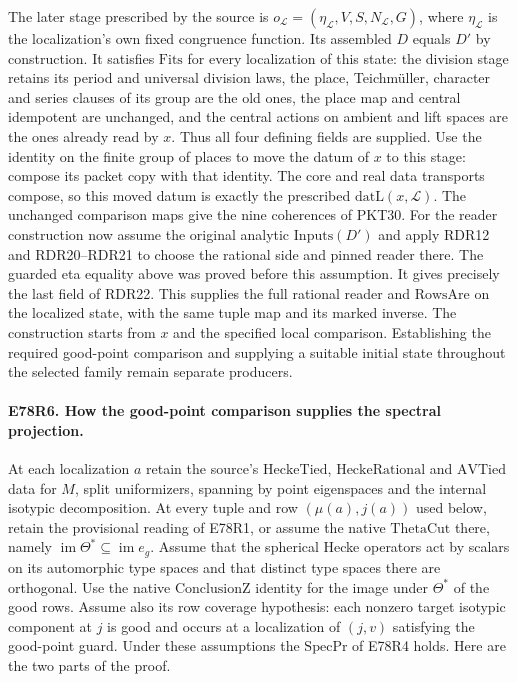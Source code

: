 The later stage prescribed by the source is
$o_{\mathcal L}=(\eta_{\mathcal L},V,S,N_{\mathcal L},G)$, where
$\eta_{\mathcal L}$ is the localization's own fixed congruence function.
Its assembled $D$ equals $D'$ by construction. It satisfies
$\mathrm{Fits}$ for every localization of this state: the division
stage retains its period and universal division laws, the place,
Teichm\"uller, character and series clauses of its group are the old
ones, the place map and central idempotent are unchanged, and the
central actions on ambient and lift spaces are the ones already
read by $x$. Thus all four defining fields are supplied. Use the identity on the finite group of places to move the datum
of $x$ to this stage: compose its packet copy with that identity.
The core and real data transports compose, so this moved datum is
exactly the prescribed $\mathrm{datL}(x,\mathcal L)$. The unchanged
comparison maps give the nine coherences of PKT30. For the reader
construction now assume the original analytic $\mathrm{Inputs}(D')$
and apply RDR12 and RDR20--RDR21 to choose the rational side and
pinned reader there. The guarded eta equality above was proved
before this assumption. It
gives precisely the last field of RDR22. This supplies the full
rational reader and $\mathrm{RowsAre}$ on the localized state, with
the same tuple map and its marked inverse. The construction starts
from $x$ and the specified local comparison. Establishing the
required good-point comparison and supplying a suitable initial state
throughout the selected family remain separate producers.

\paragraph{E78R6. How the good-point comparison supplies the spectral projection.}
At each localization $a$ retain the source's $\mathrm{HeckeTied}$,
$\mathrm{HeckeRational}$ and $\mathrm{AVTied}$ data for $M$, split
uniformizers, spanning by point eigenspaces and the internal isotypic
decomposition. At every tuple and row $(\mu(a),j(a))$ used below,
retain the provisional reading of E78R1, or assume the native
$\mathrm{ThetaCut}$ there, namely
$\operatorname{im}\Theta^*\subseteq\operatorname{im}e_g$.
Assume that the spherical Hecke operators act by scalars
on its automorphic type spaces and that distinct type spaces there
are orthogonal. Use the native $\mathrm{ConclusionZ}$ identity for
the image under $\Theta^*$ of the good rows. Assume also its row
coverage hypothesis: each nonzero target isotypic component at $j$
is good and occurs at a localization of $(j,v)$ satisfying the
good-point guard. Under these assumptions the $\mathrm{SpecPr}$ of
E78R4 holds. Here are the two parts of the proof.

